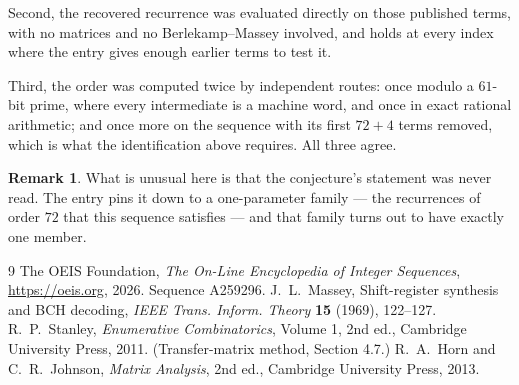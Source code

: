 \documentclass[11pt,a4paper]{article}
\theoremstyle{plain}
\theoremstyle{definition}
\newtheorem{remark}[theorem]{Remark}
\begin{document}
Second, the recovered recurrence was evaluated directly on those published terms, with no
matrices and no Berlekamp--Massey involved, and holds at every index where the entry gives
enough earlier terms to test it.

Third, the order was computed twice by independent routes: once modulo a $61$-bit prime, where
every intermediate is a machine word, and once in exact rational arithmetic; and once more on
the sequence with its first $72+4$ terms removed, which is what the identification above
requires. All three agree.

\begin{remark}
What is unusual here is that the conjecture's statement was never read. The entry pins it down
to a one-parameter family --- the recurrences of order $72$ that this sequence satisfies
--- and that family turns out to have exactly one member.
\end{remark}

\begin{thebibliography}{9}
 The OEIS Foundation, \emph{The On-Line Encyclopedia of Integer
Sequences}, \url{https://oeis.org}, 2026. Sequence A259296.
 J.~L.~Massey, Shift-register synthesis and BCH decoding, \emph{IEEE
Trans. Inform. Theory} \textbf{15} (1969), 122--127.
 R.~P.~Stanley, \emph{Enumerative Combinatorics}, Volume 1, 2nd ed.,
Cambridge University Press, 2011. (Transfer-matrix method, Section 4.7.)
 R.~A.~Horn and C.~R.~Johnson, \emph{Matrix Analysis}, 2nd ed., Cambridge
University Press, 2013.
\end{thebibliography}
\end{document}
